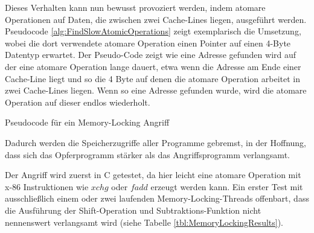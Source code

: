 Dieses Verhalten kann nun bewusst provoziert werden, indem atomare Operationen auf Daten, die zwischen zwei Cache-Lines liegen, ausgeführt werden. Pseudocode \ref{alg:FindSlowAtomicOperations} zeigt exemplarisch die Umsetzung, wobei die dort verwendete atomare Operation einen Pointer auf einen 4-Byte Datentyp erwartet. 
Der Pseudo-Code zeigt wie eine Adresse gefunden wird auf der eine atomare Operation lange dauert, etwa wenn die Adresse am Ende einer Cache-Line liegt und so die 4 Byte auf denen die atomare Operation arbeitet in zwei Cache-Lines liegen. 
Wenn so eine Adresse gefunden wurde, wird die atomare Operation auf dieser endlos wiederholt.

\begin{algorithm}[h]
\DontPrintSemicolon
\caption{Pseudocode für ein Memory-Locking Angriff}
\label{alg:FindSlowAtomicOperations}

\end{algorithm}

Dadurch werden die Speicherzugriffe aller Programme gebremst, in der Hoffnung, dass sich das Opferprogramm stärker als das Angriffsprogramm verlangsamt.

Der Angriff wird zuerst in C getestet, da hier leicht eine atomare Operation mit x-86 Instruktionen wie $xchg$ oder $fadd$ erzeugt werden kann.
Ein erster Test mit ausschließlich einem oder zwei laufenden Memory-Locking-Threads offenbart, dass die Ausführung der Shift-Operation und Subtraktions-Funktion nicht nennenswert verlangsamt wird (siehe Tabelle \ref{tbl:MemoryLockingResults}).

